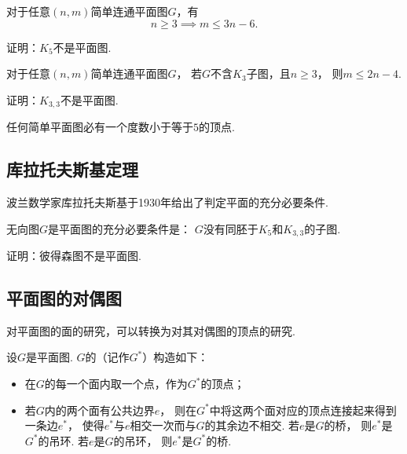 \begin{corollary}
对于任意\((n,m)\)简单连通平面图\(G\)，有\begin{equation*}
	n\geq3 \implies m\leq3n-6.
\end{equation*}
\end{corollary}

\begin{example}
证明：\(K_5\)不是平面图.
\end{example}

\begin{corollary}
对于任意\((n,m)\)简单连通平面图\(G\)，
若\(G\)不含\(K_3\)子图，且\(n\geq3\)，
则\(m\leq2n-4\).
\end{corollary}

\begin{example}
证明：\(K_{3,3}\)不是平面图.
\end{example}

\begin{theorem}
任何简单平面图必有一个度数小于等于\(5\)的顶点.
\end{theorem}

\subsection{库拉托夫斯基定理}
波兰数学家库拉托夫斯基于1930年给出了判定平面的充分必要条件.

\begin{theorem}
无向图\(G\)是平面图的充分必要条件是：
\(G\)没有同胚于\(K_5\)和\(K_{3,3}\)的子图.
\end{theorem}

\begin{example}
证明：彼得森图不是平面图.
\end{example}

\subsection{平面图的对偶图}
对平面图的面的研究，可以转换为对其对偶图的顶点的研究.
\begin{definition}
设\(G\)是平面图.
\(G\)的（记作\(G^*\)）构造如下：\begin{itemize}
	\item 在\(G\)的每一个面内取一个点，作为\(G^*\)的顶点；
	\item 若\(G\)内的两个面有公共边界\(e\)，
	则在\(G^*\)中将这两个面对应的顶点连接起来得到一条边\(e^*\)，
	使得\(e^*\)与\(e\)相交一次而与\(G\)的其余边不相交.
	若\(e\)是\(G\)的桥，
	则\(e^*\)是\(G^*\)的吊环.
	若\(e\)是\(G\)的吊环，
	则\(e^*\)是\(G^*\)的桥.
\end{itemize}
\end{definition}


